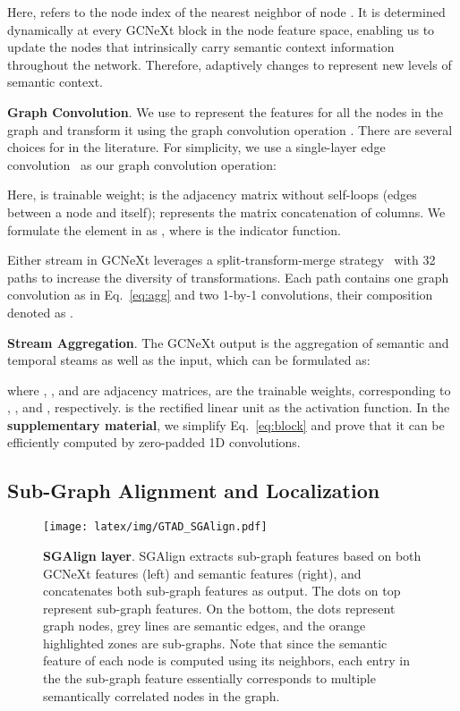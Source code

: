 \documentclass[10pt,twocolumn,letterpaper]{article}
\begin{document}
Here,  refers to the node index of the  nearest neighbor of node . It is determined dynamically at every GCNeXt block in the node feature space, enabling us to update the nodes
that intrinsically carry semantic context information throughout the network. Therefore,  adaptively changes to represent new levels of semantic context. 








\noindent \textbf{Graph Convolution}. We use 
 to represent the features for all the nodes in the graph and transform it using the graph convolution operation . There are several choices for  in the literature. For simplicity,
we use a single-layer edge convolution~\cite{wang2018dynamic} as our graph convolution operation: 

Here,  is trainable weight;
 is the adjacency matrix without self-loops (\ie edges between a node and itself);  represents the matrix concatenation of columns.
We formulate the  element in  as , 
where  is the indicator function.








Either stream in GCNeXt leverages a split-transform-merge strategy~\cite{xie2017aggregated} with 32 paths to increase the diversity of transformations. Each path contains one graph convolution as in Eq.~\ref{eq:agg}  and two 1-by-1 convolutions, their composition denoted as .


\noindent \textbf{Stream Aggregation}. The GCNeXt output is the aggregation of semantic and temporal steams as well as the input,
which can be formulated as: 

where , , and  are adjacency matrices,  are the trainable weights, corresponding to  , , and , respectively.  is the rectified linear unit as the activation function. 
In the \textbf{supplementary material}, we simplify  Eq.~\ref{eq:block}  and prove that it can be efficiently computed by zero-padded 1D convolutions.





\subsection{Sub-Graph Alignment and Localization} \label{subsec: SGAlign}

\begin{figure}
    \centering
    \texttt{[image: latex/img/GTAD\_SGAlign.pdf]}
    \caption{\textbf{SGAlign layer}. SGAlign extracts sub-graph features based on both GCNeXt features (left) and semantic features (right), and concatenates both sub-graph features as output. The dots on top represent sub-graph features. On the bottom, the dots represent graph nodes, grey lines are  semantic edges, and the orange highlighted zones are sub-graphs. Note that since the semantic feature of each node is computed using its neighbors, each entry in the the sub-graph feature essentially corresponds to multiple semantically correlated nodes in the graph.
}
    \label{fig:ga}
\end{figure}
\end{document}
